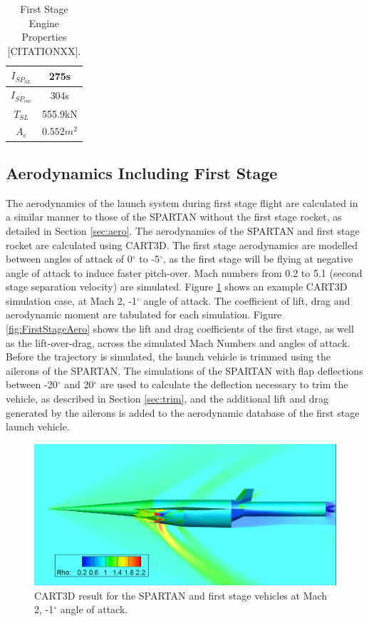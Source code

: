 \begin{table}[h]
	\centering
	\begin{tabular}{|c|c|}
		\hline  $I_{SP_{SL}}$ & 275s \\ 
		\hline  $I_{SP_{vac}}$ & 304s\\ 
		\hline  $T_{SL}$ & 555.9kN \\ 
		\hline  $A_{e}$ & $0.552m^2$ \\ 
		\hline 
	\end{tabular} 
	\caption{First Stage Engine Properties [CITATIONXX].}
	\label{tab:1stStageEngine}
\end{table}


  \subsection{Aerodynamics Including First Stage}
  
  The aerodynamics of the launch system during first stage flight are calculated in a similar manner to those of the SPARTAN without the first stage rocket, as detailed in Section \ref{sec:aero}. 
  The aerodynamics of the SPARTAN and first stage rocket are calculated using CART3D. The first stage aerodynamics are modelled between angles of attack of 0$^\circ$ to -5$^\circ$, as the first stage will be flying at negative angle of attack to induce faster pitch-over. Mach numbers from 0.2 to 5.1 (second stage separation velocity) are simulated. Figure \ref{fig:CARTcontour} shows an example CART3D simulation case, at Mach 2, -1$^\circ$ angle of attack. The coefficient of lift, drag and aerodynamic moment are tabulated for each simulation. Figure \ref{fig:FirstStageAero} shows the lift and drag coefficients of the first stage, as well as the lift-over-drag, across the simulated Mach Numbers and angles of attack. 
  Before the trajectory is simulated, the launch vehicle is trimmed using the ailerons of the SPARTAN. The simulations of the SPARTAN with flap deflections between -20$^\circ$ and 20$^\circ$ are used to calculate the deflection necessary to trim the vehicle, as described in Section \ref{sec:trim}, and the additional lift and drag generated by the ailerons is added to the aerodynamic database of the first stage launch vehicle. 
  
  
  
  \begin{figure}
  	\centering
  	\includegraphics[width=0.7\linewidth]{figures/3_vehicle_design/CARTcontour}
  	\caption{CART3D result for the SPARTAN and first stage vehicles at Mach 2, -1$^\circ$ angle of attack.}
  	\label{fig:CARTcontour}
  \end{figure}

